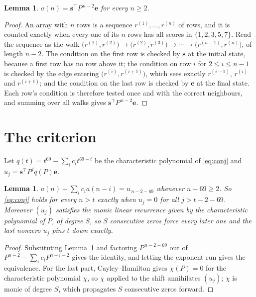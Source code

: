 \documentclass[11pt,a4paper]{article}
\theoremstyle{plain}
\newtheorem{lemma}[theorem]{Lemma}
\theoremstyle{definition}
\begin{document}
\begin{lemma}\label{lem:walk}
$a(n)=\mathbf{s}^{\!\top}P^{\,n-2}\mathbf{e}$ for every $n\ge2$.
\end{lemma}

\begin{proof}
An array with $n$ rows is a sequence $r^{(1)},\dots,r^{(n)}$ of rows, and it is counted
exactly when every one of its $n$ rows has all scores in $\{1,2,3,5,7\}$. Read the sequence as the
walk $\bigl(r^{(1)},r^{(2)}\bigr)\to\bigl(r^{(2)},r^{(3)}\bigr)\to\cdots\to
\bigl(r^{(n-1)},r^{(n)}\bigr)$, of length $n-2$. The condition on the first row is
checked by $\mathbf{s}$ at the initial state, because a first row has no row above it; the
condition on row $i$ for $2\le i\le n-1$ is checked by the edge entering
$\bigl(r^{(i)},r^{(i+1)}\bigr)$, which sees exactly $r^{(i-1)}$, $r^{(i)}$ and
$r^{(i+1)}$; and the condition on the last row is checked by $\mathbf{e}$ at the final
state. Each row's condition is therefore tested once and with the correct neighbours, and
summing over all walks gives $\mathbf{s}^{\!\top}P^{\,n-2}\mathbf{e}$.
\end{proof}

\section{The criterion}

Let $q(t)=t^{69}-\sum_i c_i t^{69-i}$ be the characteristic polynomial of
\eqref{eq:conj} and $u_j=\mathbf{s}^{\!\top}P^{j}q(P)\mathbf{e}$.

\begin{lemma}\label{lem:crit}
$a(n)-\sum_i c_i a(n-i)=u_{\,n-2-69}$ whenever $n-69\ge2$. So \eqref{eq:conj}
holds for every $n>t$ exactly when $u_j=0$ for all $j>t-2-69$. Moreover $(u_j)$
satisfies the monic linear recurrence given by the characteristic polynomial of $P$, of
degree $S$, so $S$ consecutive zeros force every later one and the last nonzero $u_j$ pins
$t$ down exactly.
\end{lemma}

\begin{proof}
Substituting Lemma~\ref{lem:walk} and factoring $P^{\,n-2-69}$ out of
$P^{n-2}-\sum_i c_i P^{n-i-2}$ gives the identity, and letting the exponent run gives the
equivalence. For the last part, Cayley--Hamilton gives $\chi(P)=0$ for the characteristic
polynomial $\chi$, so $\chi$ applied to the shift annihilates $(u_j)$; $\chi$ is monic of
degree $S$, which propagates $S$ consecutive zeros forward.
\end{proof}
\end{document}
